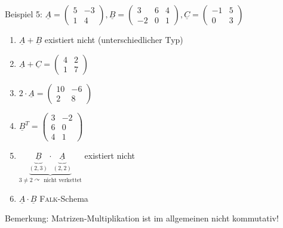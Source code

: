 \documentclass[a4paper]{scrartcl}
\begin{document}
Beispiel 5: $\underline{A}= \begin{pmatrix}
5&-3\\
1&4
\end{pmatrix}, \underline{B}= \begin{pmatrix}
3&6&4\\
-2&0&1
\end{pmatrix}, \underline{C} = \begin{pmatrix}
-1&5\\
0&3
\end{pmatrix}$
\begin{enumerate}
\item $\underline{A} + \underline{B}$ existiert nicht (unterschiedlicher Typ)
\item $\underline{A} + \underline{C} = \begin{pmatrix}
4&2\\
1&7 \end{pmatrix}$
\item $2 \cdot \underline{A} = \begin{pmatrix}10&-6\\ 2 & 8 \end{pmatrix}$
\item $\underline{B}^T= \begin{pmatrix}
3&-2\\
6&0\\
4&1 \end{pmatrix}$
\item $\underbrace{\underbrace{\underline{B}}_{(2,3)} \cdot \underbrace{\underline{A}}_{(2,2)}}_{3 \neq 2 \curvearrowright \text{ nicht verkettet}}$ existiert nicht
\item $\underline{A} \cdot \underline{B}$ \textsc{Falk}-Schema
\end{enumerate}

Bemerkung: Matrizen-Multiplikation ist im allgemeinen nicht kommutativ!
\end{document}
